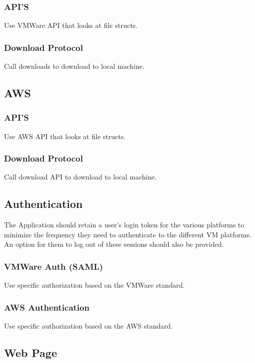 \documentclass{article}
\begin{document}
            \subsubsection{API'S}
            Use VMWare API that looks at file structs.


            \subsubsection{Download Protocol}
            Call downloads to download to local machine.

        \subsection{AWS}
            \subsubsection{API'S}
            Use AWS API that looks at file structs.

            \subsubsection{Download Protocol}
            Call download API to download to local machine.

        \subsection{Authentication}
        The Application should retain a user's login token for the various platforms to minimize the frequency they need to authenticate to the different VM platforms.
        An option for them to log out of these sessions should also be provided.

            \subsubsection{VMWare Auth (SAML)}
            Use specific authorization based on the VMWare standard.

            \subsubsection{AWS Authentication}
            Use specific authorization based on the AWS standard.

        \subsection{Web Page}
\end{document}
